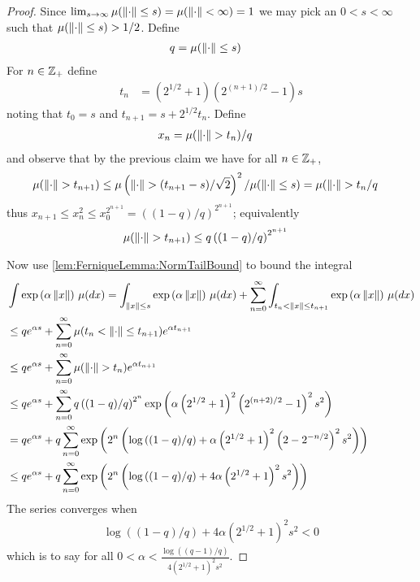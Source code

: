 \begin{proof}
Since $\lim_{s \to \infty} \mu(\left \lVert \cdot \right \rVert \leq s) = \mu(\left \lVert \cdot \right \rVert < \infty ) = 1$ we may pick an $0 < s < \infty$ such that $\mu(\left \lVert \cdot \right \rVert \leq s) > 1/2$.  Define
\begin{align*}
q &=\mu(\left \lVert \cdot \right \rVert \leq s)
\end{align*}
For $n \in \mathbb{Z}_+$ define
\begin{align*}
t_n &= \left(2^{1/2} +1 \right) \left( 2^{(n+1)/2} - 1 \right) s
\end{align*}
noting that $t_0 = s$ and $t_{n+1} = s + 2^{1/2} t_n$.  Define 
\begin{align*}
x_n &= \mu(\left \lVert \cdot \right \rVert > t_n)/q
\end{align*}
and observe that by the previous claim we have for all $n \in \mathbb{Z}_+$,
\begin{align*}
\mu(\left \lVert \cdot \right \rVert > t_{n+1}) &\leq \mu \left( \left \lVert \cdot \right \rVert > (t_{n+1}-s)/\sqrt{2}\right)^2/\mu(\left \lVert \cdot \right \rVert \leq s)
=\mu(\left \lVert \cdot \right \rVert > t_{n}/q
\end{align*}
thus $x_{n+1} \leq x_n^2 \leq x_0^{2^{n+1}} = \left((1-q)/q\right)^{2^{n+1}}$; equivalently
\begin{align}\label{lem:FerniqueLemma:NormTailBound}
\mu(\left \lVert \cdot \right \rVert > t_{n+1}) &\leq q \left((1-q)/q\right)^{2^{n+1}}
\end{align}


Now use \eqref{lem:FerniqueLemma:NormTailBound} to bound the integral
\begin{align*}
&\int \exp \left( \alpha \left \lVert x \right \rVert \right) \, \mu(dx) 
=\int_{\left \lVert x \right \rVert \leq s} \exp \left( \alpha \left \lVert x \right \rVert \right) \, \mu(dx) + \sum_{n=0}^\infty \int_{t_n < \left \lVert x \right \rVert \leq t_{n+1}} \exp \left( \alpha \left \lVert x \right \rVert \right) \, \mu(dx) \\
&\leq q e^{\alpha s} + \sum_{n=0}^\infty \mu(t_n < \left \lVert \cdot \right \rVert \leq t_{n+1}) e^{\alpha t_{n+1}} \\
&\leq q e^{\alpha s} + \sum_{n=0}^\infty \mu(\left \lVert \cdot \right \rVert > t_n) e^{\alpha t_{n+1}} \\
&\leq q e^{\alpha s} + \sum_{n=0}^\infty q  \left((1-q)/q\right)^{2^{n}} \exp\left(\alpha \left(2^{1/2} +1 \right)^2 \left( 2^{(n+2)/2} - 1 \right)^2 s^2 \right) \\
&= q e^{\alpha s} + q  \sum_{n=0}^\infty \exp\left(2^n \left( \log \left((1-q)/q\right) + \alpha \left(2^{1/2} +1 \right)^2 \left(2 - 2^{-n/2} \right)^2 s^2 \right) \right) \\
&\leq q e^{\alpha s} + q  \sum_{n=0}^\infty \exp\left(2^n \left( \log \left((1-q)/q\right) + 4 \alpha \left(2^{1/2} +1 \right)^2 s^2 \right) \right) \\
\end{align*}
The series converges when 
\begin{align*}
\log \left((1-q)/q\right) + 4 \alpha \left(2^{1/2} +1 \right)^2 s^2 < 0
\end{align*}
which is to say for all $0 < \alpha < \frac{\log((q-1)/q)}{4 \left(2^{1/2} +1 \right)^2 s^2}$.
\end{proof}

